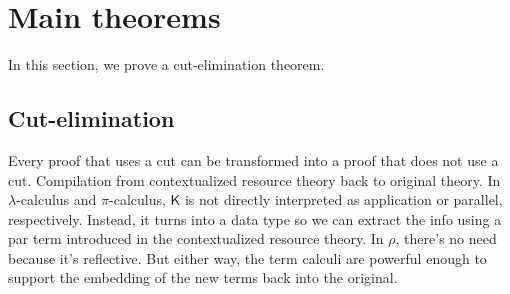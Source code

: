 \documentclass{llncs}
\renewcommand{\:}{\colon}
\newcommand{\pic}{$\pi$-calculus}
\begin{document}


















\section{Main theorems}
In this section, we prove a cut-elimination theorem.
\subsection{Cut-elimination}
Every proof that uses a cut can be transformed into a proof that does
not use a cut.  Compilation from contextualized resource theory back
to original theory. In $\lambda$-calculus and {\pic}, $\mathsf{K}$ is
not directly interpreted as application or parallel,
respectively. Instead, it turns into a data type so we can extract the
info using a par term introduced in the contextualized resource
theory.  In $\rho$, there's no need because it's reflective.  But either
way, the term calculi are powerful enough to support the embedding of
the new terms back into the original.
\end{document}
